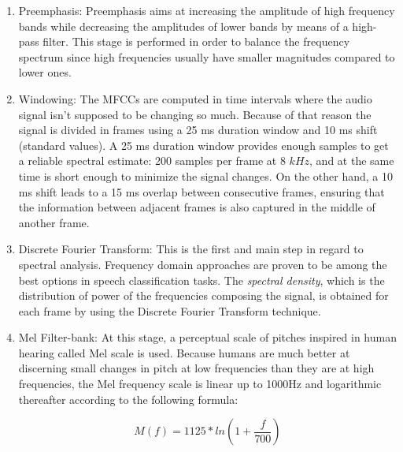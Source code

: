 \begin{enumerate}

  \item Preemphasis: Preemphasis aims at increasing the amplitude of high frequency bands while
  decreasing the amplitudes of lower bands by means of a high-pass filter. This stage is performed
  in order to balance the frequency spectrum since high frequencies usually have smaller
  magnitudes compared to lower ones.

  \item Windowing: The MFCCs are computed in time intervals where the audio signal isn't
  supposed to be changing
  so much. Because of that reason the signal is divided in frames using a
  25 ms duration window and 10 ms shift (standard values). A 25 ms duration window provides
  enough samples to get a reliable spectral estimate: 200 samples per frame at 8 $kHz$,
  and at the same time is short enough to minimize the signal changes.
  On the other hand, a 10 ms shift leads to a
  15 ms overlap between consecutive frames, ensuring that the information between adjacent
  frames is also captured in the middle of another frame.

  \item Discrete Fourier Transform: This is the first and main step in regard to spectral
  analysis. Frequency domain approaches are proven to be
  among the best options in speech classification tasks.
  The \textit{spectral density}, which is the distribution of power
  of the frequencies composing the signal, is obtained for each frame by using
  the Discrete Fourier Transform technique.   %

  \item Mel Filter-bank: At this stage, a perceptual scale of pitches inspired in human
  hearing called Mel scale is used. Because humans are much better at discerning small changes
  in pitch at low frequencies than they are at high frequencies,
  the Mel frequency scale is linear up to 1000Hz and logarithmic thereafter according to
  the following formula:

  \begin{equation}
    M(f)=1125*ln(1 + \frac{f}{700})
  \end{equation}


\end{enumerate}
